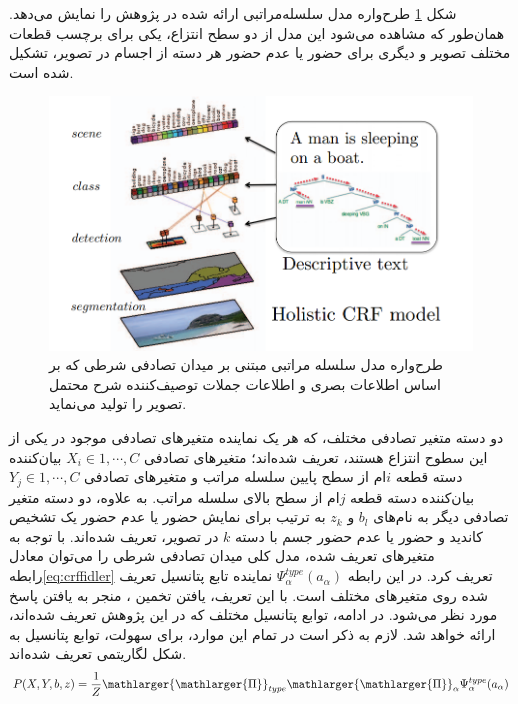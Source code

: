 شکل
\ref{fig:F2013SF1}
 طرح‌واره مدل سلسله‌مراتبی ارائه شده در پژوهش \cite{fidler2013sentence} را نمایش می‌دهد. همان‌طور که مشاهده می‌شود این مدل از دو سطح انتزاع، یکی برای برچسب قطعات مختلف تصویر و دیگری برای حضور یا عدم حضور هر دسته از اجسام در تصویر، تشکیل شده است.

\begin{figure}[h]
\center
\includegraphics[scale=0.5]{./Imgs/fidler2013sentence_f1.png}
\caption{طرح‌واره مدل سلسله مراتبی مبتنی بر میدان تصادفی شرطی که بر اساس اطلاعات بصری و اطلاعات جملات توصیف‌کننده شرح محتمل تصویر را تولید می‌نماید\cite{fidler2013sentence}.}
\label{fig:F2013SF1}
\end{figure}

دو دسته متغیر تصادفی مختلف، که هر یک نماینده متغیرهای تصادفی موجود در یکی از این سطوح انتزاع هستند، تعریف شده‌اند؛ 
متغیرهای تصادفی $X_i \in {1, \cdots,C}$ بیان‌کننده دسته قطعه $i$ام از سطح پایین سلسله مراتب و متغیرهای تصادفی $Y_j \in {1, \cdots,C}$ بیان‌کننده دسته قطعه $j$ام از سطح بالای سلسله مراتب.
به علاوه، دو دسته متغیر تصادفی دیگر به نام‌های $b_l$ و $z_k$ به ترتیب برای نمایش حضور یا عدم حضور یک تشخیص کاندید و حضور یا عدم حضور جسم با دسته $k$ در تصویر، تعریف شده‌اند. با توجه به متغیرهای تعریف شده، مدل کلی میدان تصادفی شرطی را می‌توان معادل رابطه\ref{eq:crffidler} تعریف کرد. در این رابطه $\Psi_\alpha^{type}(a_\alpha)$ نماینده تابع پتانسیل تعریف شده روی متغیرهای مختلف است. با این تعریف، یافتن تخمین ، منجر به یافتن پاسخ مورد نظر می‌شود.
در ادامه، توابع پتانسیل مختلف که در این پژوهش تعریف شده‌اند، ارائه خواهد شد. لازم به ذکر است در تمام این موارد، برای سهولت، توابع پتانسیل به شکل لگاریتمی تعریف شده‌اند.
\begin{equation}
P(X,Y,b,z) = \frac{1}{Z} \mathlarger{\mathlarger{\Pi}}_{type} \mathlarger{\mathlarger{\Pi}}_\alpha \Psi_\alpha^{type}(a_\alpha)
\label{eq:crffidler}
\end{equation}

